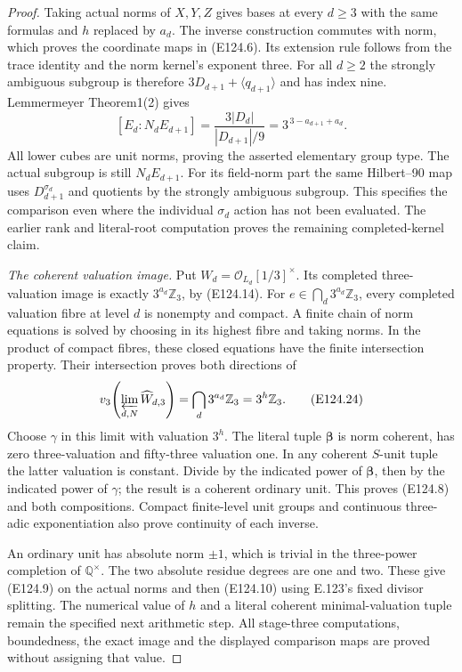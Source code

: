 \begin{proof}
Taking actual norms of $X,Y,Z$ gives bases at every
$d\ge3$ with the same formulas and $h$ replaced by $a_d$.
The inverse construction commutes with norm, which proves
the coordinate maps in (E124.6). Its extension rule follows
from the trace identity and the norm kernel's exponent three.
For all $d\ge2$ the strongly ambiguous subgroup is therefore
$3D_{d+1}+\langle q_{d+1}\rangle$ and has index nine.
Lemmermeyer Theorem1(2) gives
\[
 [E_d:N_dE_{d+1}]
   =\frac{3|D_d|}{|D_{d+1}|/9}
   =3^{\,3-a_{d+1}+a_d}.
 \tag{E124.23}
\]
All lower cubes are unit norms, proving the asserted
elementary group type. The actual subgroup is still
$N_dE_{d+1}$. For its field-norm part the same Hilbert--90
map uses $D_{d+1}^{\sigma_d}$ and quotients by the strongly
ambiguous subgroup. This specifies the comparison even
where the individual $\sigma_d$ action has not been evaluated.
The earlier rank and literal-root computation proves the
remaining completed-kernel claim.

\emph{The coherent valuation image.}
Put $W_d=\mathcal O_{L_d}[1/3]^\times$. Its completed
three-valuation image is exactly $3^{a_d}\mathbb Z_3$,
by (E124.14). For
$e\in\bigcap_d3^{a_d}\mathbb Z_3$, every completed valuation
fibre at level $d$ is nonempty and compact. A finite chain
of norm equations is solved by choosing in its highest
fibre and taking norms. In the product of compact fibres,
these closed equations have the finite intersection
property. Their intersection proves both directions of
\[
 v_3\!\left(\varprojlim_{d,N}\widehat W_{d,3}\right)
     =\bigcap_d3^{a_d}\mathbb Z_3=3^h\mathbb Z_3.
 \tag{E124.24}
\]
Choose $\gamma$ in this limit with valuation $3^h$.
The literal tuple $\boldsymbol\beta$ is norm coherent,
has zero three-valuation and fifty-three valuation one.
In any coherent $S$-unit tuple the latter valuation is
constant. Divide by the indicated power of
$\boldsymbol\beta$, then by the indicated power of
$\gamma$; the result is a coherent ordinary unit.
This proves (E124.8) and both compositions. Compact
finite-level unit groups and continuous three-adic
exponentiation also prove continuity of each inverse.

An ordinary unit has absolute norm $\pm1$, which is
trivial in the three-power completion of $\mathbb Q^\times$.
The two absolute residue degrees are one and two.
These give (E124.9) on the actual norms and then
(E124.10) using E.123's fixed divisor splitting.
The numerical value of $h$ and a literal coherent
minimal-valuation tuple remain the specified next
arithmetic step. All stage-three computations, boundedness,
the exact image and the displayed comparison maps are
proved without assigning that value.
\end{proof}
